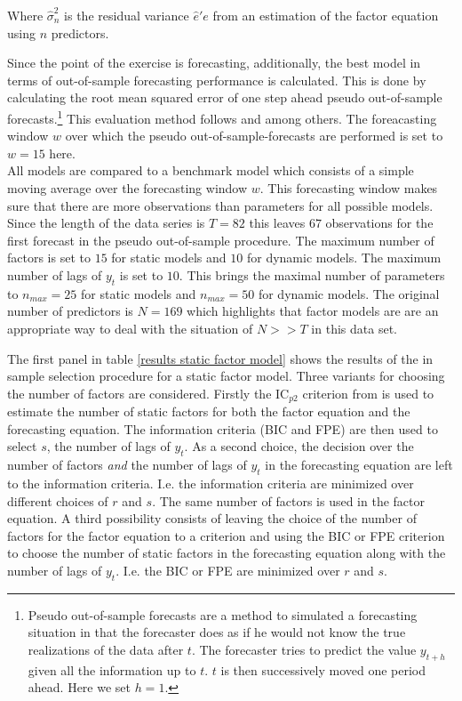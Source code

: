 \documentclass[11pt]{article}
\begin{document}
Where $\hat \sigma_n^2$ is the residual variance $\hat e'e$ from an estimation of the factor equation using $n$ predictors.

Since the point of the exercise is forecasting, additionally, the best model in terms of out-of-sample forecasting performance is calculated. This is done by calculating the root mean squared error of one step ahead pseudo out-of-sample forecasts.\footnote{Pseudo out-of-sample forecasts are a method to simulated a forecasting situation in that the forecaster does as if he would not know the true realizations of the data after $t$. The forecaster tries to predict the value $y_{t+h}$ given all the information up to $t$. $t$ is then successively moved one period ahead. Here we set $h=1$.} This evaluation method follows \citet{forni2005the} and \citet{bai2008forecasting} among others. The foreacasting window $w$ over which the pseudo out-of-sample-forecasts are performed is set to $w=15$ here. \\


All models are compared to a benchmark model which consists of a simple moving average over the forecasting window $w$. This forecasting window makes sure that there are more observations than parameters for all possible models. Since the length of the data series is $T=82$ this leaves $67$ observations for the first forecast in the pseudo out-of-sample procedure. The maximum number of factors is set to $15$ for static models and $10$ for dynamic models. The maximum number of lags of $y_t$ is set to $10$. This brings the maximal number of parameters to $n_{max} = 25$ for static models and $n_{max} = 50$ for dynamic models. The original number of predictors is $N = 169$ which highlights that factor models are are an appropriate way to deal with the situation of $N>>T$ in this data set.

The first panel in table \ref{results static factor model} shows the results of the in sample selection procedure for a static factor model. Three variants for choosing the number of factors are considered. Firstly the IC$_{p2}$ criterion from \citet{bai2002determining} is used to estimate the number of static factors for both the factor equation and the forecasting equation. The information criteria (BIC and FPE) are then used to select $s$, the number of lags of $y_t$.
As a second choice, the decision over the number of factors \textit{and} the number of lags of $y_t$ in the forecasting equation are left to the information criteria. I.e. the information criteria are minimized over different choices of $r$ and $s$. The same number of factors is used in the factor equation.
A third possibility consists of leaving the choice of the number of factors for the factor equation to a \citet{bai2002determining} criterion and using the BIC or FPE criterion to choose the number of static factors in the forecasting equation along with the number of lags of $y_t$. I.e. the BIC or FPE are minimized over $r$ and $s$.
\end{document}
